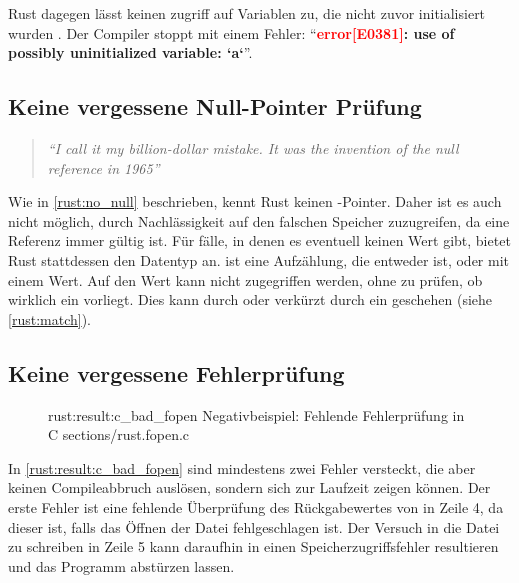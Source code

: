 Rust dagegen lässt keinen zugriff auf Variablen zu, die nicht zuvor initialisiert wurden \cite[126]{rust:orly_programming}.
Der Compiler stoppt mit einem Fehler: \enquote{\textbf{\textcolor{red}{error[E0381]}: use of possibly uninitialized variable: `a`}}.


\subsection{Keine vergessene Null-Pointer Prüfung}
\label{rust:no_null_detail}

\begin{quotation}
	\textit{\enquote{I call it my billion-dollar mistake. It was the invention of the null reference in 1965}}
	\cite[Tony Hoare, QCon Software Konferenz in London, 2009]{rust:infoq:null}
\end{quotation}

Wie in \autoref{rust:no_null} beschrieben, kennt Rust keinen -Pointer.
Daher ist es auch nicht möglich, durch Nachlässigkeit auf den falschen Speicher zuzugreifen, da eine Referenz immer gültig ist.
Für fälle, in denen es eventuell keinen Wert gibt, bietet Rust stattdessen den  Datentyp an.
 ist eine Aufzählung, die entweder  ist, oder  mit einem Wert.
Auf den Wert kann nicht zugegriffen werden, ohne zu prüfen, ob wirklich ein  vorliegt.
Dies kann durch  oder verkürzt durch ein  geschehen (siehe \autoref{rust:match}).



\subsection{Keine vergessene Fehlerprüfung}
\label{rust:result}

\begin{figure}[H]
	\ccinclude
	{rust:result:c_bad_fopen}
	{Negativbeispiel: Fehlende Fehlerprüfung in C}
	{sections/rust.fopen.c}
\end{figure}

In \autoref{rust:result:c_bad_fopen} sind mindestens zwei Fehler versteckt, die aber keinen Compileabbruch auslösen, sondern sich zur Laufzeit zeigen können.
Der erste Fehler ist eine fehlende Überprüfung des Rückgabewertes von  in Zeile 4, da dieser  ist, falls das Öffnen der Datei fehlgeschlagen ist.
Der Versuch in die Datei zu schreiben in Zeile 5 kann daraufhin in einen Speicherzugriffsfehler resultieren und das Programm abstürzen lassen.

